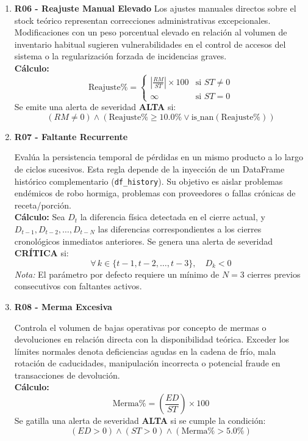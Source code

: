 \documentclass[11pt]{article}
\begin{document}
\begin{enumerate}
    \item \textbf{R06 - Reajuste Manual Elevado}
         Los ajustes manuales directos sobre el stock teórico representan correcciones administrativas excepcionales. Modificaciones con un peso porcentual elevado en relación al volumen de inventario habitual sugieren vulnerabilidades en el control de accesos del sistema o la regularización forzada de incidencias graves.
         \\
        \textbf{Cálculo:}
        \[ \text{Reajuste\%} = \begin{cases} 
        \left| \frac{RM}{ST} \right| \times 100 & \text{si } ST \neq 0 \\
        \infty & \text{si } ST = 0 
        \end{cases} \]
        Se emite una alerta de severidad \textbf{ALTA} si:
        \[ (RM \neq 0) \land \left( \text{Reajuste\%} \ge 10.0\% \lor \text{is\_nan}(\text{Reajuste\%}) \right) \]
    

    \item \textbf{R07 - Faltante Recurrente}
    
         Evalúa la persistencia temporal de pérdidas en un mismo producto a lo largo de ciclos sucesivos. Esta regla depende de la inyección de un DataFrame histórico complementario (\texttt{df\_history}). Su objetivo es aislar problemas endémicos de robo hormiga, problemas con proveedores o fallas crónicas de receta/porción.
         \\
        \textbf{Cálculo:} Sea $D_{t}$ la diferencia física detectada en el cierre actual, y $D_{t-1}, D_{t-2}, \dots, D_{t-N}$ las diferencias correspondientes a los cierres cronológicos inmediatos anteriores. 
        Se genera una alerta de severidad \textbf{CRÍTICA} si:
        \[ \forall \, k \in \{t-1, t-2, \dots, t-3\}, \quad D_{k} < 0 \]
        \textit{Nota:} El parámetro por defecto requiere un mínimo de $N = 3$ cierres previos consecutivos con faltantes activos.
    

    \item \textbf{R08 - Merma Excesiva}
    
         Controla el volumen de bajas operativas por concepto de mermas o devoluciones en relación directa con la disponibilidad teórica. Exceder los límites normales denota deficiencias agudas en la cadena de frío, mala rotación de caducidades, manipulación incorrecta o potencial fraude en transacciones de devolución.
         \\
        \textbf{Cálculo:}
        \[ \text{Merma\%} = \left( \frac{ED}{ST} \right) \times 100 \]
        Se gatilla una alerta de severidad \textbf{ALTA} si se cumple la condición:
        \[ (ED > 0) \land (ST > 0) \land (\text{Merma\%} > 5.0\%) \]
    


\end{enumerate}
\end{document}
